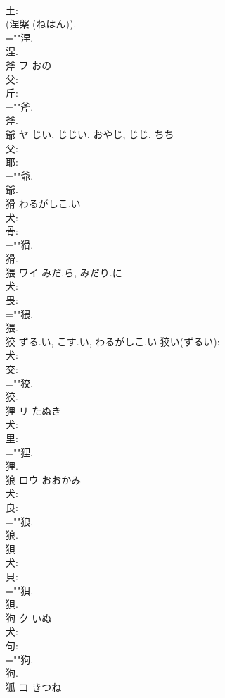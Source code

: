 \documentclass[8pt]{extreport}
\begin{document}
\begin{CJK}{UTF8}{min}
\\	土: 
\\	(涅槃 (ねはん)). 
\\	=""涅.
\\	涅.
\\	斧	フ	おの		
\\	父: 
\\	斤: 
\\	=""斧.
\\	斧.
\\	爺	ヤ	じい, じじい, おやじ, じじ, ちち		
\\	父: 
\\	耶: 
\\	=""爺.
\\	爺.
\\	猾		わるがしこ.い				
\\	犬: 
\\	骨: 
\\	=""猾.
\\	猾.
\\	猥	ワイ	みだ.ら, みだり.に		
\\	犬: 
\\	畏: 
\\	=""猥.
\\	猥.
\\	狡		ずる.い, こす.い, わるがしこ.い			狡い(ずるい): 
\\	犬: 
\\	交: 
\\	=""狡.
\\	狡.
\\	狸	リ	たぬき		
\\	犬: 
\\	里: 
\\	=""狸.
\\	狸.
\\	狼	ロウ	おおかみ		
\\	犬: 
\\	良: 
\\	=""狼.
\\	狼.
\\	狽						
\\	犬: 
\\	貝: 
\\	=""狽.
\\	狽.
\\	狗	ク	いぬ		
\\	犬: 
\\	句: 
\\	=""狗.
\\	狗.
\\	狐	コ	きつね		

\end{CJK}
\end{document}

